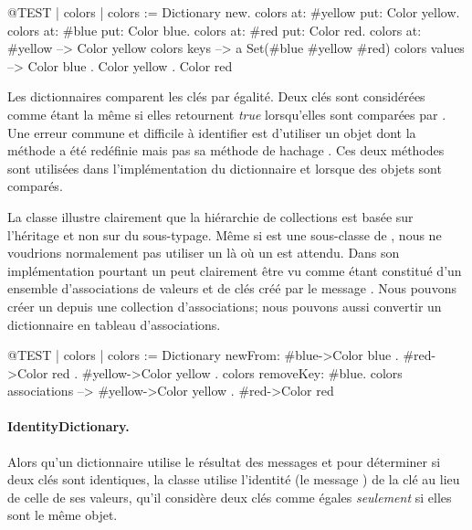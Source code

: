 \documentclass[a4paper,10pt,twoside]{book}
\begin{document}
\begin{code}{@TEST | colors |}
colors := Dictionary new.
colors at: #yellow put: Color yellow.
colors at: #blue put: Color blue.
colors at: #red put: Color red.
colors at: #yellow --> Color yellow
colors keys          --> a Set(#blue #yellow #red)
colors values       --> {Color blue . Color yellow . Color red}
\end{code}

Les dictionnaires comparent les clés par égalité. Deux clés sont
considérées comme étant la même si elles retournent \emph{true}
lorsqu'elles sont comparées par \ct{=}. Une erreur commune et difficile à
identifier est d'utiliser un objet dont la méthode \ct{=} a été
redéfinie mais pas sa méthode de hachage . Ces deux
méthodes sont utilisées dans l'implémentation du dictionnaire
et lorsque des objets sont comparés.

La classe  illustre clairement que la hiérarchie
de collections est basée sur l'héritage et non sur du sous-typage.
Même si  est une sous-classe de , nous
ne voudrions normalement pas utiliser un  là où
un  est attendu. 
Dans son implémentation pourtant un  peut
clairement être vu comme étant constitué d'un ensemble d'associations
de valeurs et de clés créé par le message . Nous
pouvons créer un  depuis une collection d'associations; nous
pouvons aussi convertir un dictionnaire en tableau d'associations.

\begin{code}{@TEST | colors |}
colors := Dictionary newFrom: { #blue->Color blue . #red->Color red . #yellow->Color yellow }.
colors removeKey: #blue.
colors associations --> {#yellow->Color yellow . #red->Color red}
\end{code}

\paragraph{IdentityDictionary.}
Alors qu'un dictionnaire utilise le résultat des messages \ct{=} et  pour déterminer si deux clés sont identiques, la classe  utilise l'identité (\cad le message ) de la clé au lieu de celle de ses valeurs, \ie qu'il considère deux clés comme égales \emph{seulement} si elles sont le même objet.
\end{document}
